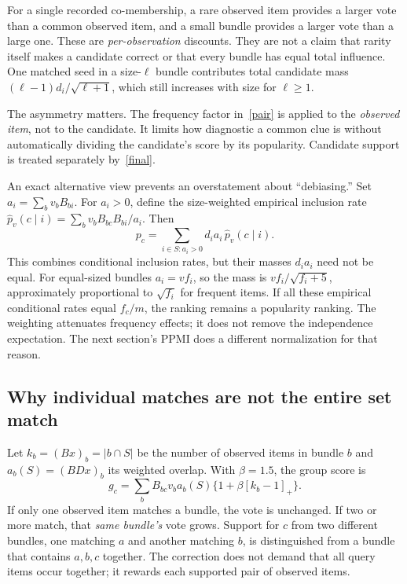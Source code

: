 \documentclass[11pt,a4paper]{article}
\begin{document}
For a single recorded co-membership, a rare observed item provides a larger vote
than a common observed item, and a small bundle provides a larger vote than a large
one. These are \emph{per-observation} discounts. They are not a claim that rarity
itself makes a candidate correct or that every bundle has equal total influence.
One matched seed in a size-$\ell$ bundle contributes total candidate mass
$(\ell-1)d_i/\sqrt{\ell+1}$, which still increases with size for $\ell\ge1$.

The asymmetry matters. The frequency factor in~\eqref{pair} is applied to the
\emph{observed item}, not to the candidate. It limits how diagnostic a common clue
is without automatically dividing the candidate's score by its popularity.
Candidate support is treated separately by~\eqref{final}.

An exact alternative view prevents an overstatement about ``debiasing.'' Set
$a_i=\sum_b v_bB_{bi}$. For $a_i>0$, define the size-weighted empirical inclusion
rate $\widehat p_v(c\mid i)=\sum_b v_bB_{bc}B_{bi}/a_i$. Then
\begin{equation}
 p_c=\sum_{i\in S:a_i>0}d_i a_i\,\widehat p_v(c\mid i).
\end{equation}
This combines conditional inclusion rates, but their masses $d_i a_i$ need not be
equal. For equal-sized bundles $a_i=vf_i$, so the mass is
$vf_i/\sqrt{f_i+5}$, approximately proportional to $\sqrt{f_i}$ for frequent
items. If all these empirical conditional rates equal $f_c/m$, the ranking
remains a popularity ranking. The weighting attenuates frequency effects; it
does not remove the independence expectation. The next section's PPMI does a
different normalization for that reason.

\subsection{Why individual matches are not the entire set match}
Let $k_b=(Bx)_b=|b\cap S|$ be the number of observed items in bundle $b$ and
$a_b(S)=(BDx)_b$ its weighted overlap. With $\beta=1.5$, the group score is
\begin{equation}\label{group}
 g_c=\sum_b B_{bc}v_ba_b(S)\{1+\beta[k_b-1]_+\}.
\end{equation}
If only one observed item matches a bundle, the vote is unchanged. If two or more
match, that \emph{same bundle's} vote grows. Support for $c$ from two different
bundles, one matching $a$ and another matching $b$, is distinguished from a bundle
that contains $a,b,c$ together. The correction does not demand that all query
items occur together; it rewards each supported pair of observed items.
\end{document}
